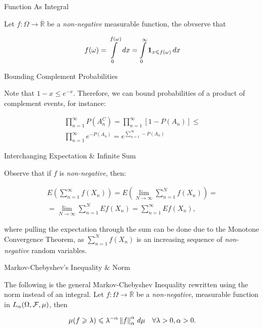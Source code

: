 \begin{observation}{}{Function As Integral}

    Let $f: \Omega \to \overline{\mathbb{R}}$ be a \emph{non-negative} measurable function, the obvserve that

        \begin{align*}
            f(\omega) = \int\limits_0^{f(\omega)} \, dx = \int\limits_0^{\infty} \mathbf{1}_{x \leqslant f(\omega)} \, dx
        \end{align*}

\end{observation}

\begin{observation}{}{Bounding Complement Probabilities}

    Note that $1 - x \leq e^{-x}$. Therefore, we can bound probabilities of a product of complement events, for instance:

        \begin{align*}
            \prod_{n = 1}^{\infty} P(A_n^C) = \prod_{n = 1}^{\infty} [1 - P(A_n)] \leq \\ \prod_{n = 1}^{\infty} e^{-P(A_n)} = e^{\sum_{n = 1}^{\infty} -P(A_n)}
        \end{align*}

\end{observation}

\begin{observation}{}{Interchanging Expectation \& Infinite Sum}

    Observe that if $f$ is \emph{non-negative}, then:

        \begin{align*}
            E\left(\sum_{n=1}^{\infty} f(X_n)\right) = 
            E\left(\lim_{N \to \infty} \sum_{n=1}^{N} f(X_n)\right) = \\
            = \lim_{N \to \infty} \sum_{n=1}^{N} E f(X_n) = 
            \sum_{n=1}^{\infty} E f(X_n),
        \end{align*}

    where pulling the expectation through the sum can be done due to the Monotone Convergence Theorem, as $\sum_{n=1}^{N} f(X_n)$ is an increasing sequence of \emph{non-negative} random variables.

\end{observation}

\begin{observation}{}{Markov-Chebyshev's Inequality \& Norm}

    The following is the general Markov-Chebyshev Inequality rewritten using the norm instead of an integral. Let $f: \Omega \to \overline{\mathbb{R}}$ be a \emph{non-negative}, measurable function in $L_{\alpha}(\Omega, \mathcal{F}, \mu)$, then

        \begin{align*}
            \mu(f \geq \lambda) \leq \lambda^{-\alpha} \Norm{f}_{\alpha}^{\alpha} \, d\mu \quad \forall \lambda > 0, \alpha > 0.
        \end{align*}

\end{observation}

